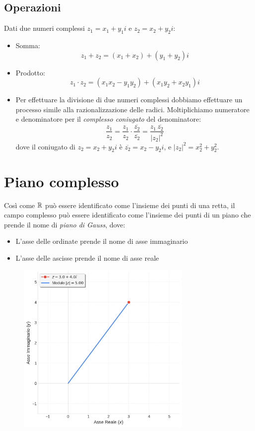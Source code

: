 \subsection{Operazioni}
Dati due numeri complessi $z_1 = x_1 + y_1i$ e $z_2 = x_2 + y_2i$:
\begin{itemize}
  \item Somma:
  \[
    z_1 + z_2 = (x_1 + x_2) + (y_1 + y_2)i
  \]

  \item Prodotto:
  \[
    z_1 \cdot z_2 = (x_1x_2 - y_1y_2) + (x_1y_2 + x_2y_1)i
  \]

  \item Per effettuare la divisione di due numeri complessi dobbiamo effettuare un processo simile alla razionalizzazione delle radici.  
  Moltiplichiamo numeratore e denominatore per il \emph{complesso coniugato} del denominatore:
  \[
    \frac{z_1}{z_2} = \frac{z_1}{z_2} \cdot \frac{\overline{z_2}}{\overline{z_2}} = 
    \frac{z_1 \, \overline{z_2}}{|z_2|^2}
  \]
  dove il coniugato di $z_2 = x_2 + y_2i$ è $\overline{z_2} = x_2 - y_2i$, e $|z_2|^2 = x_2^2 + y_2^2$.
\end{itemize}

  \section{Piano complesso}
  Così come $\mathbb{R}$ può essere identificato come l'insieme dei punti di una retta, il campo complesso può essere identificato come l'insieme dei punti di un piano che prende il nome di \emph{piano di Gauss}, dove:
  \begin{itemize}
  \item L'asse delle ordinate prende il nome di asse immaginario
  \item L'asse delle ascisse prende il nome di asse reale
  \end{itemize}
  
    \begin{figure}[H]
    \centering
    \includegraphics[width=0.75\textwidth]{img/piano_gauss.png}
  \end{figure}

